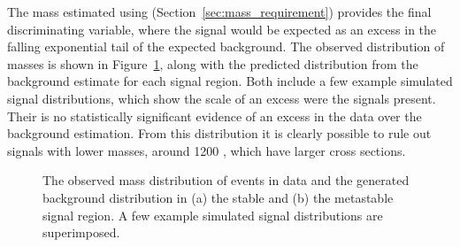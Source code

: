The mass estimated using \dedx (Section~\ref{sec:mass_requirement}) provides the final discriminating variable, where the signal would be expected as an excess in the falling exponential tail of the expected background.
The observed distribution of masses is shown in Figure~\ref{fig:signal_mass}, along with the predicted distribution from the background estimate for each signal region.
Both include a few example simulated signal distributions, which show the scale of an excess were the \rhadron signals present.
Their is no statistically significant evidence of an excess in the data over the background estimation.
From this distribution it is clearly possible to rule out signals with lower masses, around 1200 \GeV, which have larger cross sections.

\begin{figure}
\caption{The observed mass distribution of events in data and the generated background distribution in (a) the stable and (b) the metastable signal region. A few example simulated signal distributions are superimposed.}
\label{fig:signal_mass}
\end{figure}

